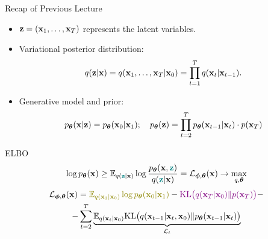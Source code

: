 \documentclass{beamer}
\begin{document}
\begin{frame}{Recap of Previous Lecture}
	\begin{itemize}
		\item $\mathbf{z} = (\mathbf{x}_1, \dots, \mathbf{x}_T)$ represents the latent variables.
		\item Variational posterior distribution:
		\vspace{-0.2cm}
		\[
			q(\mathbf{z} | \mathbf{x}) = q(\mathbf{x}_1, \dots, \mathbf{x}_T | \mathbf{x}_0) = \prod_{t = 1}^T q(\mathbf{x}_t | \mathbf{x}_{t - 1}).
		\]
		\vspace{-0.3cm}
		\item Generative model and prior:
		\vspace{-0.2cm}
		\[
			p_{\boldsymbol{\theta}}(\mathbf{x} | \mathbf{z}) = p_{\boldsymbol{\theta}}(\mathbf{x}_0 | \mathbf{x}_1); \quad 
			p_{\boldsymbol{\theta}}(\mathbf{z}) = \prod_{t=2}^T p_{\boldsymbol{\theta}}(\mathbf{x}_{t - 1} | \mathbf{x}_t) \cdot p(\mathbf{x}_T)
		\]
	\end{itemize}
	\vspace{-0.2cm}
	\begin{block}{ELBO}
		\vspace{-0.2cm}
		\[
			\log p_{\boldsymbol{\theta}}(\mathbf{x}) \geq \mathbb{E}_{q({\color{teal}\mathbf{z}} | \mathbf{x})} \log \frac{p_{\boldsymbol{\theta}}(\mathbf{x}, {\color{teal}\mathbf{z}})}{q({\color{teal}\mathbf{z}} | \mathbf{x})} = \mathcal{L}_{\boldsymbol{\phi}, \boldsymbol{\theta}}(\mathbf{x}) \rightarrow \max_{q, \boldsymbol{\theta}}
		\]
		\vspace{-0.5cm}
		\begin{multline*}
			\cL_{\bphi, \btheta}(\bx) =  {\color{olive}\bbE_{q(\bx_1 | \bx_0)} \log \pt(\bx_0 | \bx_1)} - {\color{violet}\KL\bigl(q(\bx_T | \bx_0) \| p(\bx_T)\bigr)} - \\
			- \sum_{t=2}^T  \underbrace{ \bbE_{q(\bx_t | \bx_0)}\KL \bigl(q(\bx_{t-1} | \bx_t, \bx_0) \| \pt(\bx_{t-1} | \bx_t)\bigr)}_{\cL_t}
		\end{multline*}
	\end{block}
\end{frame}
\end{document}
